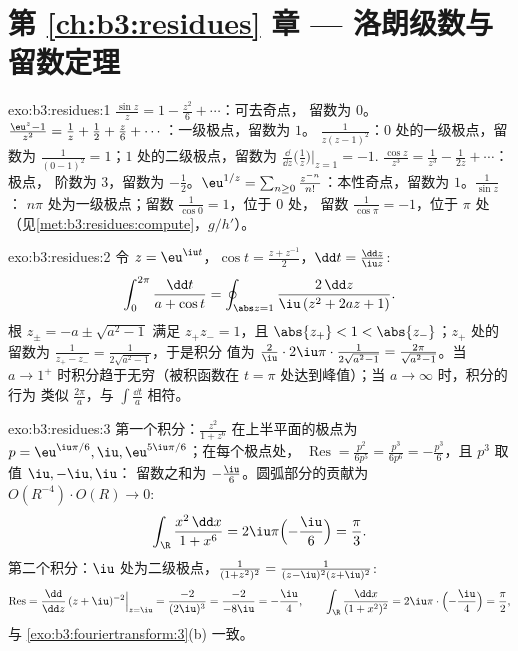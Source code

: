 \section*{第 \ref{ch:b3:residues} 章 --- 洛朗级数与
留数定理}

\begin{solution}{exo:b3:residues:1}
$\frac{\sin z}z = 1 - \frac{z^2}6 + \cdots$：可去奇点，
留数为 $0$。$\frac{\eu^z - 1}{z^2} = \frac1z + \frac12 +
\frac z6 + \cdots$：一级极点，留数为 $1$。
$\frac1{z(z-1)^2}$：$0$ 处的一级极点，留数为
$\frac1{(0-1)^2} = 1$；$1$ 处的二级极点，留数为
$\frac{\dd}{\dd z}\bigl(\frac1z\bigr)\big|_{z=1} = -1$.
$\frac{\cos z}{z^3} = \frac1{z^3} - \frac1{2z} + \cdots$：极点，
阶数为 $3$，留数为 $-\frac12$。$\eu^{1/z} = \sum_{n\geq0}
\frac{z^{-n}}{n!}$：本性奇点，留数为 $1$。$\frac1{\sin z}$：
$n\pi$ 处为一级极点；留数 $\frac1{\cos 0} = 1$，位于 $0$ 处，
留数 $\frac1{\cos\pi} = -1$，位于 $\pi$ 处
（见\cref{met:b3:residues:compute}，$g/h'$）。
\end{solution}

\begin{solution}{exo:b3:residues:2}
令 $z = \eu^{\iu t}$，$\cos t = \frac{z + z^{-1}}2$，$\dd t
= \frac{\dd z}{\iu z}$:
\[
\int_0^{2\pi}\frac{\dd t}{a + \cos t}
= \oint_{\abs z = 1}\frac{2\,\dd z}{\iu\,(z^2 + 2az + 1)} .
\]
根 $z_\pm = -a \pm \sqrt{a^2 - 1}$ 满足 $z_+z_- =
1$，且 $\abs{z_+} < 1 < \abs{z_-}$；$z_+$ 处的留数为
$\frac{1}{z_+ - z_-} = \frac1{2\sqrt{a^2-1}}$，于是积分
值为 $\frac2\iu\cdot2\iu\pi\cdot\frac1{2\sqrt{a^2-1}} =
\frac{2\pi}{\sqrt{a^2-1}}$。当 $a \to 1^+$ 时积分趋于无穷（被积函数在
$t = \pi$ 处达到峰值）；当 $a \to \infty$ 时，积分的行为
类似 $\frac{2\pi}a$，与 $\int\frac{\dd t}a$ 相符。
\end{solution}

\begin{solution}{exo:b3:residues:3}
第一个积分：$\frac{z^2}{1+z^6}$ 在上半平面的极点为 $p =
\eu^{\iu\pi/6}, \iu, \eu^{5\iu\pi/6}$；在每个极点处，
$\operatorname{Res} = \frac{p^2}{6p^5} = \frac{p^3}{6p^6} =
-\frac{p^3}6$，且 $p^3$ 取值 $\iu, -\iu, \iu$：
留数之和为 $-\frac{\iu}{6}$。圆弧部分的贡献为
$O(R^{-4})\cdot O(R) \to 0$:
\[
\int_\R\frac{x^2\,\dd x}{1 + x^6} =
2\iu\pi\Bigl(-\frac \iu6\Bigr) = \frac\pi3 .
\]
第二个积分：$\iu$ 处为二级极点，$\frac1{(1+z^2)^2} =
\frac1{(z-\iu)^2(z+\iu)^2}$:
\[
\operatorname{Res} = \frac{\dd}{\dd z}\,(z +
\iu)^{-2}\Big|_{z=\iu} = \frac{-2}{(2\iu)^3} =
\frac{-2}{-8\iu} = -\frac\iu4,
\qquad
\int_\R\frac{\dd x}{(1+x^2)^2} =
2\iu\pi\cdot\Bigl(-\frac\iu4\Bigr) = \frac\pi2 ,
\]
与 \cref{exo:b3:fouriertransform:3}(b) 一致。
\end{solution}

